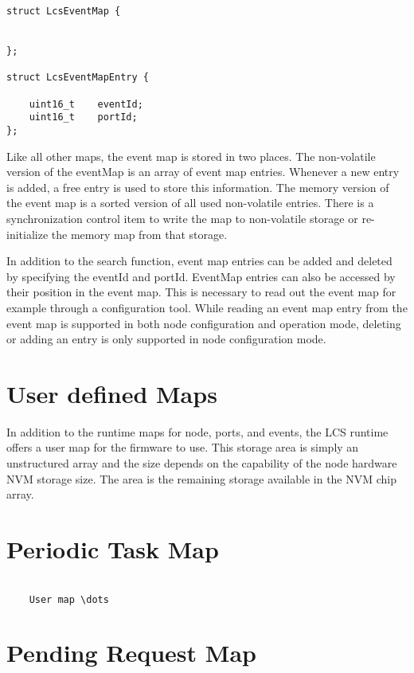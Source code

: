 \lstset{language=c++, style=codesnippetstyle}
\begin{lstlisting}
struct LcsEventMap {


};

struct LcsEventMapEntry {

    uint16_t	eventId;
    uint16_t 	portId;
};
\end{lstlisting}
\FloatBarrier

Like all other maps, the event map is stored in two places. The non-volatile version of the eventMap is an array of event map entries. Whenever a new entry is added, a free entry is used to store this information. The memory version of the event map is a sorted version of all used non-volatile entries. There is a synchronization control item to write the map to non-volatile storage or re-initialize the memory map from that storage.

In addition to the search function, event map entries can be added and deleted by specifying the eventId and portId. EventMap entries can also be accessed by their position in the event map. This is necessary to read out the event map for example through a configuration tool. While reading an event map entry from the event map is supported in both node configuration and operation mode, deleting or adding an entry is only supported in node configuration mode.

\section{User defined Maps}

In addition to the runtime maps for node, ports, and events, the LCS runtime offers a user map for the firmware to use. This storage area is simply an unstructured array and the size depends on the capability of the node hardware NVM storage size. The area is the remaining storage available in the NVM chip array.

\section{Periodic Task Map}

\lstset{language=c++, style=codesnippetstyle}
\begin{lstlisting}

    User map \dots

\end{lstlisting}
\FloatBarrier

 \section{Pending Request Map}


